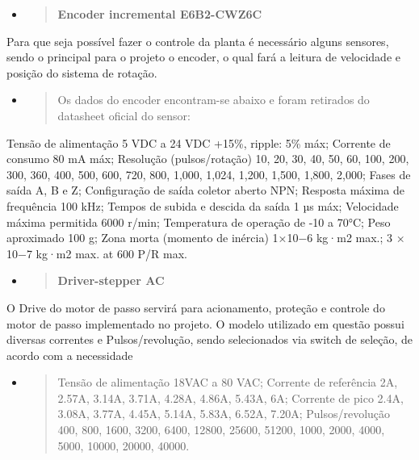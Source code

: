 \documentclass[]{article}
\begin{document}
\begin{itemize}
\item
  \begin{quote}
  \textbf{Encoder incremental E6B2-CWZ6C}
  \end{quote}
\end{itemize}

Para que seja possível fazer o controle da planta é necessário alguns
sensores, sendo o principal para o projeto o encoder, o qual fará a
leitura de velocidade e posição do sistema de rotação.

\begin{itemize}
\item
  \begin{quote}
  Os dados do encoder encontram-se abaixo e foram retirados do datasheet
  oficial do sensor:
  \end{quote}
\end{itemize}

Tensão de alimentação 5 VDC a 24 VDC +15\%, ripple: 5\% máx; Corrente de
consumo 80 mA máx; Resolução (pulsos/rotação) 10, 20, 30, 40, 50, 60,
100, 200, 300, 360, 400, 500, 600, 720, 800, 1,000, 1,024, 1,200, 1,500,
1,800, 2,000; Fases de saída A, B e Z; Configuração de saída coletor
aberto NPN; Resposta máxima de frequência 100 kHz; Tempos de subida e
descida da saída 1 µs máx; Velocidade máxima permitida 6000 r/min;
Temperatura de operação de -10 a 70°C; Peso aproximado 100 g; Zona morta
(momento de inércia) 1×10−6 kg·m2 max.; 3 × 10−7 kg·m2 max. at 600 P/R
max.

\begin{itemize}
\item
  \begin{quote}
  \textbf{Driver-stepper AC}
  \end{quote}
\end{itemize}

O Drive do motor de passo servirá para acionamento, proteção e controle
do motor de passo implementado no projeto. O modelo utilizado em questão
possui diversas correntes e Pulsos/revolução, sendo selecionados via
switch de seleção, de acordo com a necessidade

\begin{itemize}
\item
  \begin{quote}
  Tensão de alimentação 18VAC a 80 VAC; Corrente de referência 2A,
  2.57A, 3.14A, 3.71A, 4.28A, 4.86A, 5.43A, 6A; Corrente de pico 2.4A,
  3.08A, 3.77A, 4.45A, 5.14A, 5.83A, 6.52A, 7.20A; Pulsos/revolução 400,
  800, 1600, 3200, 6400, 12800, 25600, 51200, 1000, 2000, 4000, 5000,
  10000, 20000, 40000.
  \end{quote}
\end{itemize}
\end{document}
